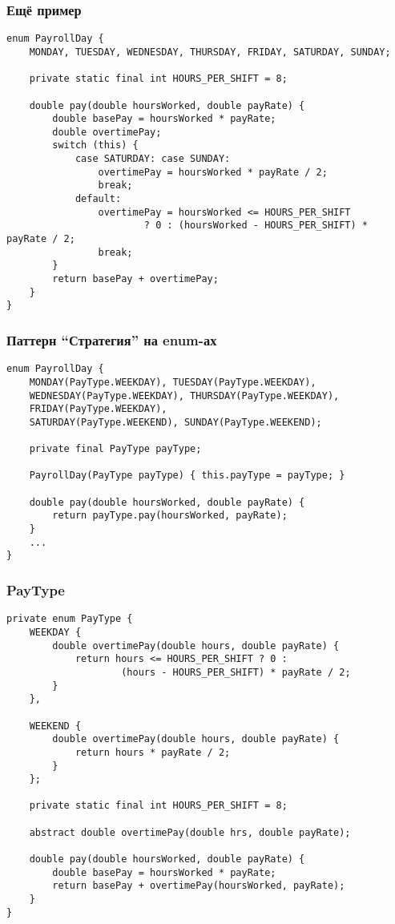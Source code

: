 \documentclass[xetex,mathserif,serif]{beamer}
\begin{document}
	\begin{frame}[fragile]
		\frametitle{Ещё пример}
		\begin{scriptsize}
			\begin{verbatim}
enum PayrollDay {
    MONDAY, TUESDAY, WEDNESDAY, THURSDAY, FRIDAY, SATURDAY, SUNDAY;

    private static final int HOURS_PER_SHIFT = 8;

    double pay(double hoursWorked, double payRate) {
        double basePay = hoursWorked * payRate;
        double overtimePay;
        switch (this) {
            case SATURDAY: case SUNDAY:
                overtimePay = hoursWorked * payRate / 2;
                break;
            default:
                overtimePay = hoursWorked <= HOURS_PER_SHIFT 
                        ? 0 : (hoursWorked - HOURS_PER_SHIFT) * payRate / 2;
                break;
        }
        return basePay + overtimePay;
    }
}
			\end{verbatim}
		\end{scriptsize}
	\end{frame}

	\begin{frame}[fragile]
		\frametitle{Паттерн ``Стратегия'' на enum-ах}
		\begin{footnotesize}
			\begin{verbatim}
enum PayrollDay {
    MONDAY(PayType.WEEKDAY), TUESDAY(PayType.WEEKDAY),
    WEDNESDAY(PayType.WEEKDAY), THURSDAY(PayType.WEEKDAY),
    FRIDAY(PayType.WEEKDAY),
    SATURDAY(PayType.WEEKEND), SUNDAY(PayType.WEEKEND);
    
    private final PayType payType;

    PayrollDay(PayType payType) { this.payType = payType; }

    double pay(double hoursWorked, double payRate) {
        return payType.pay(hoursWorked, payRate);
    }
    ...
}
			\end{verbatim}
		\end{footnotesize}
	\end{frame}

	\begin{frame}[fragile]
		\frametitle{PayType}
		\begin{scriptsize}
			\begin{verbatim}
private enum PayType {
    WEEKDAY {
        double overtimePay(double hours, double payRate) {
            return hours <= HOURS_PER_SHIFT ? 0 :
                    (hours - HOURS_PER_SHIFT) * payRate / 2;
        }
    },

    WEEKEND {
        double overtimePay(double hours, double payRate) {
            return hours * payRate / 2;
        }
    };

    private static final int HOURS_PER_SHIFT = 8;
    
    abstract double overtimePay(double hrs, double payRate);
    
    double pay(double hoursWorked, double payRate) {
        double basePay = hoursWorked * payRate;
        return basePay + overtimePay(hoursWorked, payRate);
    }
}
			\end{verbatim}
		\end{scriptsize}
	\end{frame}
\end{document}

